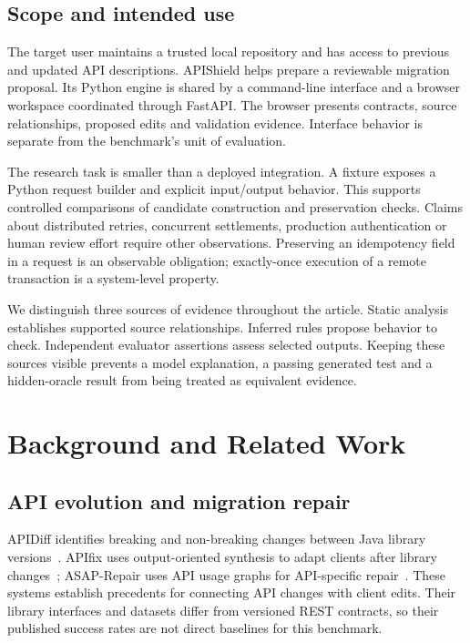 \ifAccess
\subsection{Scope and intended use}
The target user maintains a trusted local repository and has access to previous and updated API descriptions. APIShield helps prepare a reviewable migration proposal. Its Python engine is shared by a command-line interface and a browser workspace coordinated through FastAPI. The browser presents contracts, source relationships, proposed edits and validation evidence. Interface behavior is separate from the benchmark's unit of evaluation.

The research task is smaller than a deployed integration. A fixture exposes a Python request builder and explicit input/output behavior. This supports controlled comparisons of candidate construction and preservation checks. Claims about distributed retries, concurrent settlements, production authentication or human review effort require other observations. Preserving an idempotency field in a request is an observable obligation; exactly-once execution of a remote transaction is a system-level property.

We distinguish three sources of evidence throughout the article. Static analysis establishes supported source relationships. Inferred rules propose behavior to check. Independent evaluator assertions assess selected outputs. Keeping these sources visible prevents a model explanation, a passing generated test and a hidden-oracle result from being treated as equivalent evidence.
\fi

\section{Background and Related Work}
\subsection{API evolution and migration repair}
APIDiff identifies breaking and non-breaking changes between Java library versions~\cite{apidiff2018}. APIfix uses output-oriented synthesis to adapt clients after library changes~\cite{apifix2021}; ASAP-Repair uses API usage graphs for API-specific repair~\cite{asap2024}. These systems establish precedents for connecting API changes with client edits. Their library interfaces and datasets differ from versioned REST contracts, so their published success rates are not direct baselines for this benchmark.

